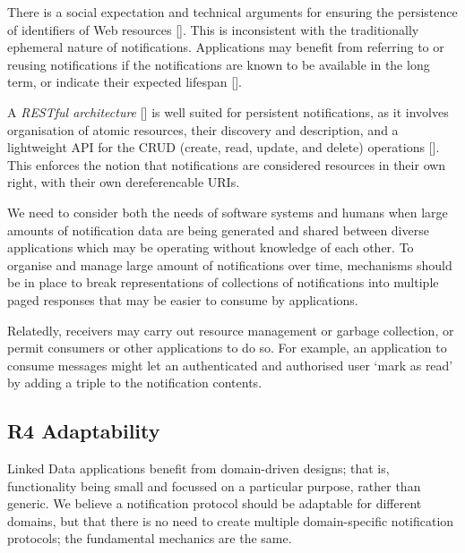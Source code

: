 \documentclass[a4paper]{llncs}
\begin{document}
\par There is a social expectation and technical arguments for ensuring the persistence of identifiers of Web resources []. This is inconsistent with the traditionally ephemeral nature of notifications. Applications may benefit from referring to or reusing notifications if the notifications are known to be available in the long term, or indicate their expected lifespan [].


\par A {\em RESTful architecture} [] is well suited for persistent notifications, as it involves organisation of atomic resources, their discovery and description, and a lightweight API for the CRUD (create, read, update, and delete) operations []. This enforces the notion that notifications are considered resources in their own right, with their own dereferencable URIs.


\par We need to consider both the needs of software systems and humans when large amounts of notification data are being generated and shared between diverse applications which may be operating without knowledge of each other. To organise and manage large amount of notifications over time, mechanisms should be in place to break representations of collections of notifications into multiple paged responses that may be easier to consume by applications.


\par Relatedly, receivers may carry out resource management or garbage collection, or permit consumers or other applications to do so. For example, an application to consume messages might let an authenticated and authorised user ‘mark as read’ by adding a triple to the notification contents.




                                \subsection{R4 Adaptability}
  \label{adaptability}





\par Linked Data applications benefit from domain-driven designs; that is, functionality being small and focussed on a particular purpose, rather than generic. We believe a notification protocol should be adaptable for different domains, but that there is no need to create multiple domain-specific notification protocols; the fundamental mechanics are the same.
\end{document}
